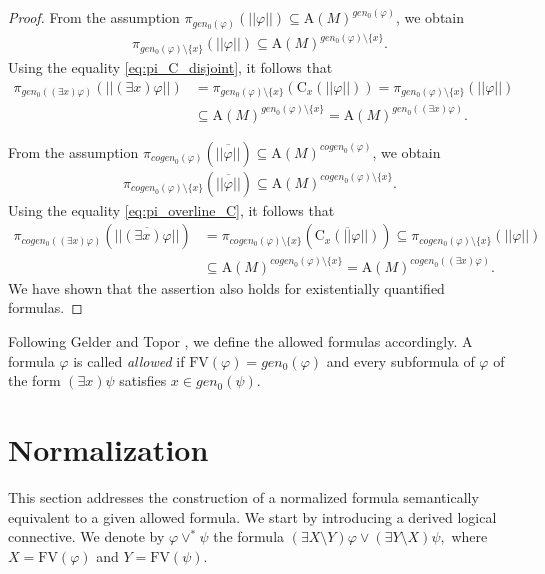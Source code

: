 \documentclass{lmcs}
\def\C{\textrm{C}}
\def\A{\textrm{A}}
\def\FV{\textrm{FV}}
\def\gen{gen}
\def\cogen{cogen}
\def\genz{\gen_0}
\def\cogenz{\cogen_0}
\begin{document}
\begin{proof}
From the assumption $\pi_{\genz(\varphi)}(||\varphi||)\subseteq \A(M)^{\genz(\varphi)}$, we obtain
\begin{align*}
\pi_{\genz(\varphi)\setminus\{x\}}(||\varphi||)\subseteq \A(M)^{\genz(\varphi)\setminus\{x\}}. 
\end{align*}
Using the equality \eqref{eq:pi_C_disjoint}, it follows that
\begin{align*}
\pi_{\genz((\exists x)\varphi)}(||(\exists x)\varphi||)&=\pi_{\genz(\varphi)\setminus\{x\}}(\C_x(||\varphi||))=\pi_{\genz(\varphi)\setminus\{x\}}(||\varphi||)\\
&\subseteq\A(M)^{\genz(\varphi)\setminus\{x\}}=\A(M)^{\genz((\exists x)\varphi)}.
\end{align*}

From the assumption $\pi_{\cogenz(\varphi)}(\overline{||\varphi||})\subseteq \A(M)^{\cogenz(\varphi)}$, we obtain
\begin{align*}
\pi_{\cogenz(\varphi)\setminus\{x\}}(\overline{||\varphi||})\subseteq \A(M)^{\cogenz(\varphi)\setminus\{x\}}. 
\end{align*}
Using the equality \eqref{eq:pi_overline_C}, it follows that
\begin{align*}
\pi_{\cogenz((\exists x)\varphi)}(\overline{||(\exists x)\varphi||})&=\pi_{\cogenz(\varphi)\setminus\{x\}}(\overline{\C_x(||\varphi||)})\subseteq\pi_{\cogenz(\varphi)\setminus\{x\}}(||\varphi||)\\
&\subseteq\A(M)^{\cogenz(\varphi)\setminus\{x\}}=\A(M)^{\cogenz((\exists x)\varphi)}.
\end{align*}
We have shown that the assertion also holds for existentially quantified formulas.
\end{proof}

Following Gelder and Topor \cite{GelderTopoer:safety}, we define the allowed formulas accordingly.
A formula $\varphi$ is called \emph{allowed} if $\FV(\varphi)=\genz(\varphi)$ and every subformula of $\varphi$ of the form $(\exists x)\psi$ satisfies $x\in\genz(\psi)$.


\section{Normalization}\label{sec:normalization}
This section addresses the construction of a normalized formula semantically equivalent to a given allowed formula. We start by introducing a derived logical connective. We denote by $\varphi\vee^*\psi$  the formula  $(\exists X\setminus Y)\varphi\vee(\exists Y\setminus X)\psi,$ where $X=\FV(\varphi)$ and $Y=\FV(\psi)$.
\end{document}
